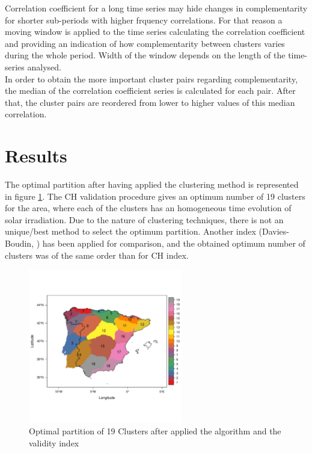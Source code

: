 Correlation coefficient for a long time series may hide changes in complementarity for shorter sub-periods with higher frquency correlations. For that reason a moving window is applied to the time series calculating the correlation coefficient and providing an indication of how complementarity between clusters varies during the whole period. Width of the window depends on the length of the time-series analysed.\\

In order to obtain the more important cluster pairs regarding complementarity, the median of the correlation coefficient series is calculated for each pair. After that, the cluster pairs are reordered from lower to higher values of this median correlation.\\
 

\section{Results}

The optimal partition after having applied the clustering method is represented in figure \ref{clusters}. The CH validation procedure gives an optimum number of 19 clusters for the area, where each of the clusters has an homogeneous time evolution of solar irradiation. Due to the nature of clustering techniques, there is not an unique/best method to select the optimum partition. Another index (Davies-Boudin, \cite{davies1979cluster}) has been applied for comparison, and the obtained optimum number of clusters was of the same order than for CH index.
 
\begin{figure}[h!]
\centering\includegraphics[width=0.6\textwidth]{figs/capitulo5/clusters2}
\caption{Optimal partition of 19 Clusters after applied the algorithm and the validity index}
\label{clusters}
\end{figure}


